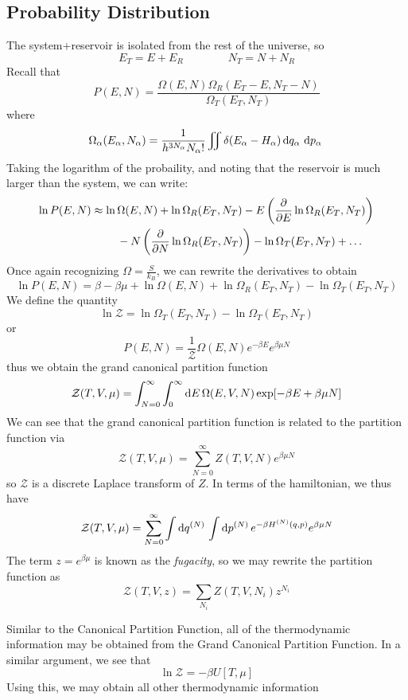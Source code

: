 \subsection{Probability Distribution}
The system+reservoir is isolated from the rest of the universe, so
\[E_T = E+E_R\qquad\qquad N_T=N+N_R\]
Recall that
\[P(E,N) = \frac{\Omega(E,N)\Omega_R(E_T-E, N_T-N)}{\Omega_T(E_T,N_T)}\]
where
\[\Omega_\alpha(E_\alpha, N_\alpha) = \frac{1}{h^{3N_\alpha}N_\alpha!}\iint \delta(E_\alpha-H_\alpha)\d{q_\alpha}\d{p_\alpha}\]
Taking the logarithm of the probaility, and noting that the reservoir is much larger than the system, we can write:
\begin{align*}
	\ln P(E,N)&\approx \ln\Omega(E,N)+\ln \Omega_R(E_T,N_T) -E\left(\frac{\partial }{\partial E}\ln\Omega_R(E_T,N_T)\right)\\
		  &\hphantom{===}-N\left(\frac{\partial }{\partial N}\ln\Omega_R(E_T,N_T)\right)-\ln\Omega_T(E_T,N_T)+\dots
\end{align*}
Once again recognizing \(\Omega = \frac{S}{k_B}\), we can rewrite the derivatives to obtain
\[\ln P(E,N)=\beta-\beta\mu +\ln\Omega(E,N)+\ln\Omega_R(E_T,N_T)-\ln\Omega_T(E_T,N_T)\]
We define the quantity 
\[\ln \mathcal Z = \ln\Omega_T(E_T,N_T)-\ln\Omega_T(E_T,N_T)\]
or
\[P(E,N) =\frac{1}{\mathcal Z} \Omega(E,N)e^{-\beta E}e^{\beta \mu N}\]
thus we obtain the grand canonical partition function
\begin{equation}
	\mathcal Z(T,V,\mu) = \int_{N=0}^\infty\int_0^\infty\d{E}\Omega(E,V,N)\exp[-\beta E +\beta\mu N]
\end{equation}
We can see that the grand canonical partition function is related to the partition function via
\begin{equation}
	\mathcal Z(T,V,\mu) = \sum_{N=0}^\infty Z(T,V,N)e^{\beta \mu N}
\end{equation}
so \(\mathcal Z\) is a discrete Laplace transform of \(Z\). In terms of the hamiltonian, we thus have
\begin{equation}
	\mathcal Z(T,V,\mu) = \sum_{N=0}^\infty \int\d{q^{(N)}}\int\d{p^{(N)}}e^{-\beta H^{(N)}(q,p)}e^{\beta \mu N}
\end{equation}
The term \(z=e^{\beta\mu}\) is known as the \emph{fugacity}, so we may rewrite the partition function as
\begin{equation}
	\mathcal Z(T,V,z) = \sum_{N_i} Z(T,V,N_i)z^{N_i}
\end{equation}

Similar to the Canonical Partition Function, all of the thermodynamic information may be obtained from the Grand Canonical Partition Function. In a similar argument, we see that
\begin{equation}
	\ln \mathcal Z = -\beta U[T,\mu]
\end{equation}
Using this, we may obtain all other thermodynamic information

